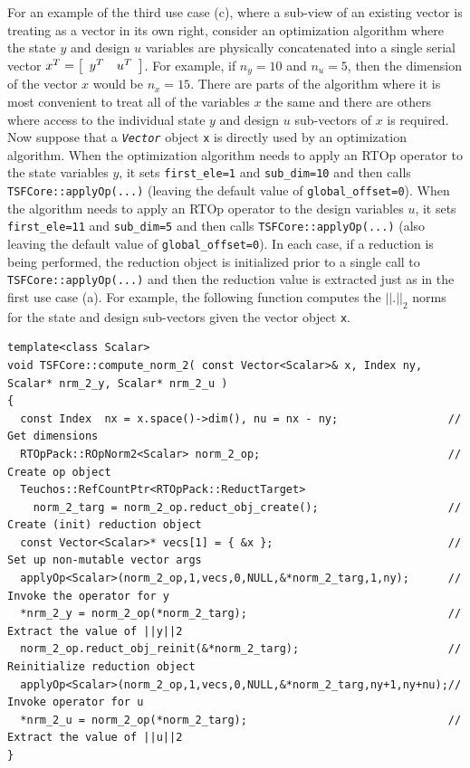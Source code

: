 For an example of the third use case (c), where a sub-view of an
existing vector is treating as a vector in its own right, consider an
optimization algorithm where the state $y$ and design $u$ variables
are physically concatenated into a single serial vector $x^T =
{\bmat{cc} y^T & u^T \emat}$.  For example, if $n_y = 10$ and $n_u =
5$, then the dimension of the vector $x$ would be $n_x = 15$.  There
are parts of the algorithm where it is most convenient to treat all of
the variables $x$ the same and there are others where access to the
individual state $y$ and design $u$ sub-vectors of $x$ is required.
Now suppose that a {}\texttt{\textit{Vector}} object {}\texttt{x} is
directly used by an optimization algorithm.  When the optimization
algorithm needs to apply an RTOp operator to the state variables $y$,
it sets {}\texttt{first\_ele=1} and {}\texttt{sub\_dim=10} and then
calls {}\texttt{TSFCore::applyOp(\-...)} (leaving the default value of
{}\texttt{global\_offset=0}).  When the algorithm needs to apply an
RTOp operator to the design variables $u$, it sets
{}\texttt{first\_ele=11} and {}\texttt{sub\_dim=5} and then calls
{}\texttt{TSFCore::applyOp(\-...)} (also leaving the default value of
{}\texttt{global\_offset=0}).  In each case, if a reduction is being
performed, the reduction object is initialized prior to a single call
to {}\texttt{TSFCore::applyOp(\-...)} and then the reduction value is
extracted just as in the first use case (a).  For example, the
following function computes the $||.||_2$ norms for the state and
design sub-vectors given the vector object {}\texttt{x}.

{\scriptsize\begin{verbatim}
template<class Scalar>
void TSFCore::compute_norm_2( const Vector<Scalar>& x, Index ny, Scalar* nrm_2_y, Scalar* nrm_2_u )
{
  const Index  nx = x.space()->dim(), nu = nx - ny;                 // Get dimensions
  RTOpPack::ROpNorm2<Scalar> norm_2_op;                             // Create op object
  Teuchos::RefCountPtr<RTOpPack::ReductTarget>
    norm_2_targ = norm_2_op.reduct_obj_create();                    // Create (init) reduction object
  const Vector<Scalar>* vecs[1] = { &x };                           // Set up non-mutable vector args
  applyOp<Scalar>(norm_2_op,1,vecs,0,NULL,&*norm_2_targ,1,ny);      // Invoke the operator for y
  *nrm_2_y = norm_2_op(*norm_2_targ);                               // Extract the value of ||y||2
  norm_2_op.reduct_obj_reinit(&*norm_2_targ);                       // Reinitialize reduction object
  applyOp<Scalar>(norm_2_op,1,vecs,0,NULL,&*norm_2_targ,ny+1,ny+nu);// Invoke operator for u
  *nrm_2_u = norm_2_op(*norm_2_targ);                               // Extract the value of ||u||2
}
\end{verbatim}}

